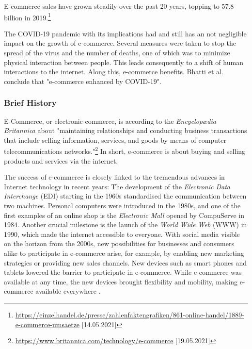 E-commerce sales have grown steadily over the past 20 years, topping to 57.8 billion in 2019.\footnote{\url{https://einzelhandel.de/presse/zahlenfaktengrafiken/861-online-handel/1889-e-commerce-umsaetze} [14.05.2021]}

The COVID-19 pandemic with its implications had and still has an not negligible impact on the growth of e-commerce.
Several measures were taken to stop the spread of the virus and the number of deaths, one of which was to minimize physical interaction between people.
This leads consequently to a shift of human interactions to the internet.
Along this, e-commerce benefits.
Bhatti et al. \cite{2020Bhatti} conclude that "e-commerce enhanced by COVID-19".



\subsubsection{Brief History}

E-Commerce, or electronic commerce, is according to the \textit{Encyclopædia Britannica} about "maintaining relationships and conducting business transactions that include selling information, services, and goods by means of computer telecommunications networks."\footnote{\url{https://www.britannica.com/technology/e-commerce} [19.05.2021]}
In short, e-commerce is about buying and selling products and services via the internet.


The success of e-commerce is closely linked to the tremendous advances in Internet technology in recent years:
The development of the \textit{Electronic Data Interchange} (EDI) starting in the 1960s standardised the communication between two machines.
Personal computers were introduced in the 1980s, and one of the first examples of an online shop is the \textit{Electronic Mall} opened by CompuServe in 1984.
Another crucial milestone is the launch of the \textit{World Wide Web} (WWW) in 1990, which made the internet accessible to everyone.
With social media visible on the horizon from the 2000s, new possibilities for businesses and consumers alike to participate in e-commerce arise, for example, by enabling new marketing strategies or providing new sales channels.
New devices such as smart phones and tablets lowered the barrier to participate in e-commerce.
While e-commerce was available at any time, the new devices brought flexibility and mobility, making e-commerce available everywhere \cite{2019Hermogeno}.

